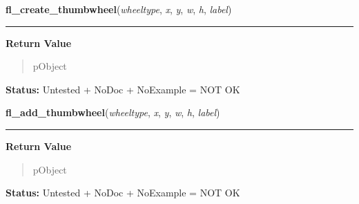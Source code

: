 \hspace{.8\funcindent}\begin{boxedminipage}{\funcwidth}

    \raggedright \textbf{fl\_create\_thumbwheel}(\textit{wheeltype}, \textit{x}, \textit{y}, \textit{w}, \textit{h}, \textit{label})

    \vspace{-1.5ex}

    \rule{\textwidth}{0.5\fboxrule}
\setlength{\parskip}{2ex}
\setlength{\parskip}{1ex}
      \textbf{Return Value}
    \vspace{-1ex}

      \begin{quote}
      pObject

      \end{quote}

\textbf{Status:} Untested + NoDoc + NoExample = NOT OK



    \end{boxedminipage}

    \label{xformslib:library:fl_add_thumbwheel}

    \vspace{0.5ex}

\hspace{.8\funcindent}\begin{boxedminipage}{\funcwidth}

    \raggedright \textbf{fl\_add\_thumbwheel}(\textit{wheeltype}, \textit{x}, \textit{y}, \textit{w}, \textit{h}, \textit{label})

    \vspace{-1.5ex}

    \rule{\textwidth}{0.5\fboxrule}
\setlength{\parskip}{2ex}
\setlength{\parskip}{1ex}
      \textbf{Return Value}
    \vspace{-1ex}

      \begin{quote}
      pObject

      \end{quote}

\textbf{Status:} Untested + NoDoc + NoExample = NOT OK



    \end{boxedminipage}

    \label{xformslib:library:fl_create_timer}

